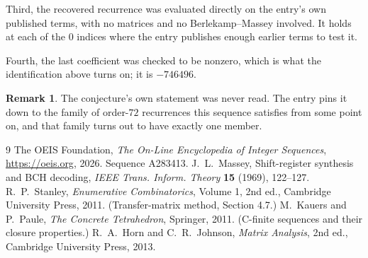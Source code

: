 \documentclass[11pt,a4paper]{article}
\theoremstyle{plain}
\theoremstyle{definition}
\newtheorem{remark}[theorem]{Remark}
\begin{document}
Third, the recovered recurrence was evaluated directly on the entry's own published terms, with
no matrices and no Berlekamp--Massey involved. It holds at each of the $0$ indices where
the entry publishes enough earlier terms to test it.

Fourth, the last coefficient was checked to be nonzero, which is what the identification above
turns on; it is $-746496$.

\begin{remark}
The conjecture's own statement was never read. The entry pins it down to the family of
order-$72$ recurrences this sequence satisfies from some point on, and that family turns
out to have exactly one member.
\end{remark}

\begin{thebibliography}{9}
 The OEIS Foundation, \emph{The On-Line Encyclopedia of Integer
Sequences}, \url{https://oeis.org}, 2026. Sequence A283413.
 J.~L.~Massey, Shift-register synthesis and BCH decoding, \emph{IEEE
Trans. Inform. Theory} \textbf{15} (1969), 122--127.
 R.~P.~Stanley, \emph{Enumerative Combinatorics}, Volume 1, 2nd ed.,
Cambridge University Press, 2011. (Transfer-matrix method, Section 4.7.)
 M.~Kauers and P.~Paule, \emph{The Concrete Tetrahedron}, Springer, 2011.
(C-finite sequences and their closure properties.)
 R.~A.~Horn and C.~R.~Johnson, \emph{Matrix Analysis}, 2nd ed., Cambridge
University Press, 2013.
\end{thebibliography}
\end{document}
